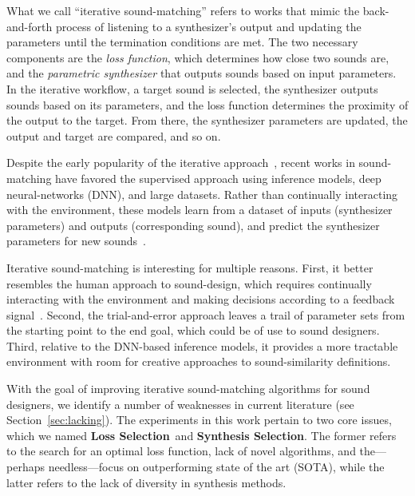 \documentclass[lettersize,journal]{IEEEtran}
\providecommand{\gls}[1]{#1}
\newcommand{\LossSelect}{\textbf{Loss Selection}}
\newcommand{\SynthSelect}{\textbf{Synthesis Selection}}
\begin{document}
What we call ``iterative sound-matching'' refers to works that mimic the back-and-forth process of listening to a synthesizer's output and updating the parameters until the termination conditions are met. The two necessary components are the \textit{loss function}, which determines how close two sounds are, and the \textit{parametric synthesizer} that outputs sounds based on input parameters. In the iterative workflow, a target sound is selected, the synthesizer outputs sounds based on its parameters, and the loss function determines the proximity of the output to the target. From there, the synthesizer parameters are updated, the output and target are compared, and so on. 

Despite the early popularity of the iterative approach~\cite{justice1979analytic,horner1993machine,mitchell2007evolutionary}, recent works in sound-matching have favored the supervised approach using inference models, deep neural-networks (\gls{DNN}), and large datasets. Rather than continually interacting with the environment, these models learn from a dataset of inputs (synthesizer parameters) and outputs (corresponding sound), and predict the synthesizer parameters for new sounds~\cite{yee2018automatic,han2023perceptual,han2024learning}. 

Iterative sound-matching is interesting for multiple reasons. First, it better resembles the human approach to sound-design, which requires continually interacting with the environment and making decisions according to a feedback signal~\cite{sutton2018reinforcement}. Second, the trial-and-error approach leaves a trail of parameter sets from the starting point to the end goal, which could be of use to sound designers. Third, relative to the DNN-based inference models, it provides a more tractable environment with room for creative approaches to sound-similarity definitions. 

With the goal of improving iterative sound-matching algorithms for sound designers, we identify a number of weaknesses in current literature (see Section~\ref{sec:lacking}). The experiments in this work pertain to two core issues, which we named \LossSelect~and \SynthSelect. The former refers to the search for an optimal loss function, lack of novel algorithms, and the---perhaps needless---focus on outperforming state of the art (\gls{SOTA}), while the latter refers to the lack of diversity in synthesis methods.
\end{document}
